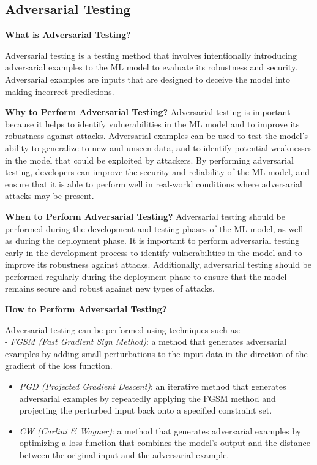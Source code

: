 \documentclass[
  letterpaper,
  DIV=11,
  numbers=noendperiod,
  oneside]{scrreprt}
\begin{document}
\begin{tcolorbox}
\subsection{Adversarial Testing}\label{adversarial-testing}

\textbf{What is Adversarial Testing?}

Adversarial testing{} is a testing method that involves intentionally
introducing adversarial examples to the ML model to evaluate its
robustness and security. Adversarial examples are inputs that are
designed to deceive the model into making incorrect predictions.

\textbf{Why to Perform Adversarial Testing?} Adversarial testing is
important because it helps to identify vulnerabilities in the ML model
and to improve its robustness against attacks. Adversarial examples can
be used to test the model's ability to generalize to new and unseen
data, and to identify potential weaknesses in the model that could be
exploited by attackers. By performing adversarial testing, developers
can improve the security and reliability of the ML model, and ensure
that it is able to perform well in real-world conditions where
adversarial attacks may be present.

\textbf{When to Perform Adversarial Testing?} Adversarial testing should
be performed during the development and testing phases of the ML model,
as well as during the deployment phase. It is important to perform
adversarial testing early in the development process to identify
vulnerabilities in the model and to improve its robustness against
attacks. Additionally, adversarial testing should be performed regularly
during the deployment phase to ensure that the model remains secure and
robust against new types of attacks.

\textbf{How to Perform Adversarial Testing?}

Adversarial testing can be performed using techniques such as:\\
- \emph{FGSM (Fast Gradient Sign Method)}: a method that generates
adversarial examples by adding small perturbations to the input data in
the direction of the gradient of the loss function.

\begin{itemize}
\item
  \emph{PGD (Projected Gradient Descent)}: an iterative method that
  generates adversarial examples by repeatedly applying the FGSM method
  and projecting the perturbed input back onto a specified constraint
  set.
\item
  \emph{CW (Carlini \& Wagner)}: a method that generates adversarial
  examples by optimizing a loss function that combines the model's
  output and the distance between the original input and the adversarial
  example.
\end{itemize}


\end{tcolorbox}
\end{document}
